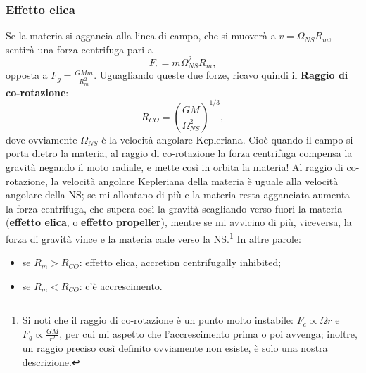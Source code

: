 \subsubsection{Effetto elica}
Se la materia si aggancia alla linea di campo, che si muoverà a $v = \Omega_{NS}R_m $, sentirà una forza centrifuga pari a 
\begin{equation}
    F_c = m\Omega^2_{NS}R_m,
\end{equation}
opposta a $F_g = \frac{GMm}{R_m^2}$.
Uguagliando queste due forze, ricavo quindi il \textbf{Raggio di co-rotazione}:
\begin{equation}
    R_{CO}=\left( \frac{GM}{\Omega_{NS}^2} \right)^{1/3},
    \label{eq: raggio di corotazione}
\end{equation}
dove ovviamente $\Omega_{NS} $ è la velocità angolare Kepleriana.
Cioè quando il campo si porta dietro la materia, al raggio di co-rotazione la forza centrifuga compensa la gravità negando il moto radiale, e mette così in orbita la materia!
Al raggio di co-rotazione, la velocità angolare Kepleriana della materia è uguale alla velocità angolare della NS; se mi allontano di più  e la materia resta agganciata aumenta la forza centrifuga, che supera così la gravità scagliando verso fuori la materia (\textbf{effetto elica}, o \textbf{effetto propeller}), mentre se mi avvicino di più, viceversa, la forza di gravità vince e la materia cade verso la NS.\footnote{Si noti che il raggio di co-rotazione è un punto molto instabile: $F_c\propto \Omega r$ e $F_g\propto \frac{GM}{r^2} $, per cui mi aspetto che l'accrescimento prima o poi avvenga; inoltre, un raggio preciso così definito ovviamente non esiste, è solo una nostra descrizione.}
In altre parole:
\begin{itemize}
    \item se $R_m>R_{CO}$: effetto elica, accretion centrifugally inhibited;
    \item se $R_m<R_{CO}$: c'è accrescimento. 
\end{itemize}

